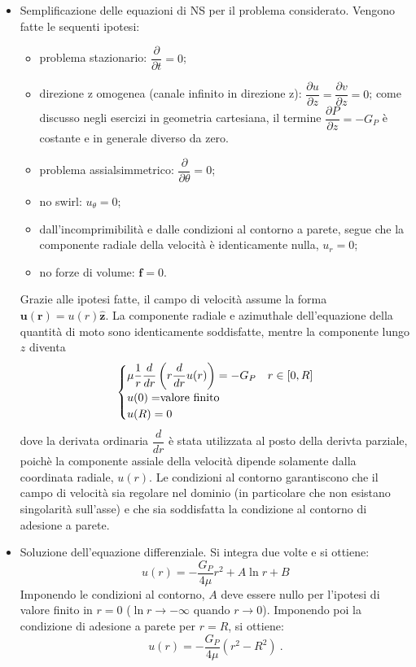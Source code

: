\begin{itemize}
  \item Semplificazione delle equazioni di NS per il problema considerato. Vengono fatte le sequenti ipotesi:
\begin{itemize}
\item problema stazionario: $\dfrac{\partial}{\partial t} = 0$;
\item direzione z omogenea (canale infinito in direzione z): $\dfrac{\partial u}{\partial z} = \dfrac{\partial v}{\partial z} = 0$; come discusso negli esercizi in geometria cartesiana, il termine $\dfrac{\partial P}{\partial z} = - G_P$ è costante e in generale diverso da zero.

\item problema assialsimmetrico: $\dfrac{\partial}{\partial \theta} = 0$;
\item no swirl: $u_{\theta} = 0$;
\item dall'incomprimibilità e dalle condizioni al contorno a parete, segue che la componente radiale della velocità è identicamente nulla, $u_r = 0$;
\item no forze di volume: $\bm{f} = 0$.
\end{itemize}

Grazie alle ipotesi fatte, il campo di velocità assume la forma $\bm{u}(\bm{r}) = u(r) \bm{\hat{z}}$. La componente radiale e azimuthale dell'equazione della quantità di moto sono identicamente soddisfatte, mentre la componente lungo $z$ diventa
\begin{equation}
  \begin{cases}
     \mu \dfrac{1}{r} \dfrac{d}{dr}\left( r \dfrac{d}{dr} u(r)\right) = -G_P & r \in[0,R] \\
    u(0) = $valore finito$  \\ u(R) = 0
  \end{cases}
  \end{equation}
dove la derivata ordinaria $\dfrac{d}{d r}$ è stata utilizzata al posto della derivta parziale, poichè la componente assiale della velocità dipende solamente dalla coordinata radiale, $u(r)$. Le condizioni al contorno garantiscono che il campo di velocità sia regolare nel dominio (in particolare che non esistano singolarità sull'asse) e che sia soddisfatta la condizione al contorno di adesione a parete.

\item Soluzione dell'equazione differenziale. Si integra due volte e si ottiene:
\begin{equation}
  u(r) = -\dfrac{G_P}{4 \mu} r^2 + A \ln{r} + B
\end{equation}
Imponendo le condizioni al contorno, $A$ deve essere nullo per l'ipotesi di valore finito in $r=0$ ($\ln r \rightarrow -\infty$ quando $r \rightarrow 0$). Imponendo poi la condizione di adesione a parete per $r=R$, si ottiene:
\begin{equation}
  u(r) = -\dfrac{G_P}{4 \mu} (r^2 - R^2) \ .
\end{equation}


\end{itemize}
